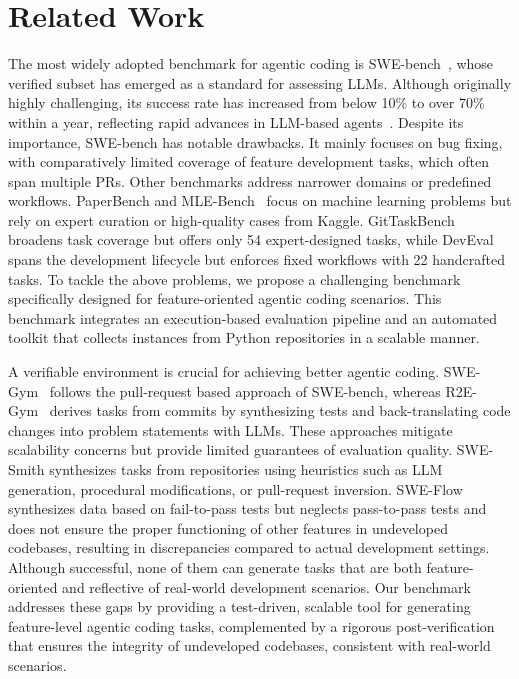 \documentclass{article}
\newcommand{\myparagraph}[1]{\noindent{\bf #1}}
\begin{document}
\section{Related Work}
\label{related_work}
\myparagraph{Agentic Coding Benchmarks.} The most widely adopted benchmark for agentic coding is SWE-bench~\citep{jimenez2024swebench}, whose verified subset has emerged as a standard for assessing LLMs. Although originally highly challenging, its success rate has increased from below 10\% to over 70\% within a year, reflecting rapid advances in LLM-based agents~\citep{anthropic_claude_code,yang2025qwen3}. Despite its importance, SWE-bench has notable drawbacks. It mainly focuses on bug fixing, with comparatively limited coverage of feature development tasks, which often span multiple PRs. Other benchmarks address narrower domains or predefined workflows. PaperBench \citep{starace2025paperbench} and MLE-Bench~\citep{chan2025mlebench} focus on machine learning problems but rely on expert curation or high-quality cases from Kaggle. GitTaskBench \citep{ni2025gittaskbench} broadens task coverage but offers only 54 expert-designed tasks, while DevEval \citep{li2024prompting} spans the development lifecycle but enforces fixed workflows with 22 handcrafted tasks. To tackle the above problems, we propose a challenging benchmark specifically designed for feature-oriented agentic coding scenarios. This benchmark integrates an execution-based evaluation pipeline and an automated toolkit that collects instances from Python repositories in a scalable manner.

\myparagraph{Scalable Collection Pipeline.} A verifiable environment is crucial for achieving better agentic coding. SWE-Gym~\citep{swegym2025icml} follows the pull-request based approach of SWE-bench, whereas R2E-Gym~\citep{r2egym2025colm} derives tasks from commits by synthesizing tests and back-translating code changes into problem statements with LLMs. These approaches mitigate scalability concerns but provide limited guarantees of evaluation quality. SWE-Smith \citep{swesmith2025} synthesizes tasks from repositories using heuristics such as LLM generation, procedural modifications, or pull-request inversion. SWE-Flow~\citep{zhang2025sweflow} synthesizes data based on fail-to-pass tests but neglects pass-to-pass tests and does not ensure the proper functioning of other features in undeveloped codebases, resulting in discrepancies compared to actual development settings.  Although successful, none of them can generate tasks that are both feature-oriented and reflective of real-world development scenarios. Our benchmark addresses these gaps by providing a test-driven, scalable tool for generating feature-level agentic coding tasks, complemented by a rigorous post-verification that ensures the integrity of undeveloped codebases, consistent with real-world scenarios.
\end{document}
